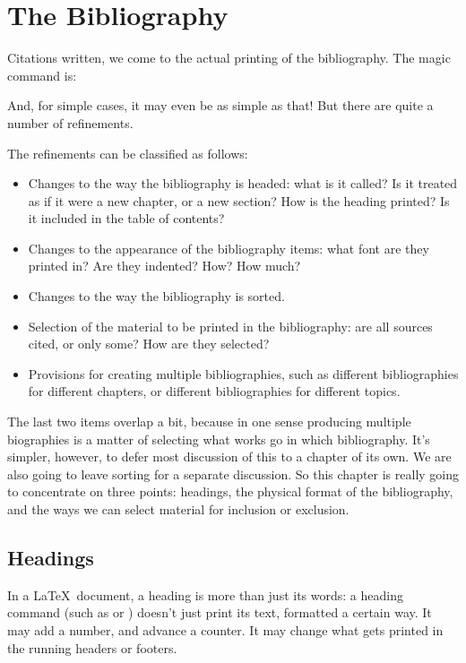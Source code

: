 \chapter{The Bibliography}

Citations written, we come to the actual printing of the
bibliography. The magic command is:
\begin{center}
\end{center}
And, for simple cases, it may even be as simple as that! But there are
quite a number of refinements.

The refinements can be classified as follows:
\begin{itemize}
\item Changes to the way the bibliography is headed: what is it
  called? Is it treated as if it were a new chapter, or a new section?
  How is the heading printed? Is it included in the table of contents?
\item Changes to the appearance of the bibliography items: what font
  are they printed in? Are they indented? How? How much?
\item Changes to the way the bibliography is sorted.
\item Selection of the material to be printed in the bibliography: are
  all sources cited, or only some? How are they selected?
\item Provisions for creating multiple bibliographies, such as
  different bibliographies for different chapters, or different
  bibliographies for different topics.
\end{itemize}
The last two items overlap a bit, because in one sense producing
multiple biographies is a matter of selecting what works go in which
bibliography. It's simpler, however, to defer most discussion of this
to a chapter of its own. We are also going to leave sorting for a
separate discussion. So this chapter is really going to concentrate on
three points: headings, the physical format of the bibliography, and
the ways we can select material for inclusion or exclusion.

\section{Headings}

In a \LaTeX\ document, a heading is more than just its words: a heading command (such as  or ) doesn't just print its text, formatted a certain way. It may add a number, and advance a counter. It may change what gets printed in the running headers or footers.


